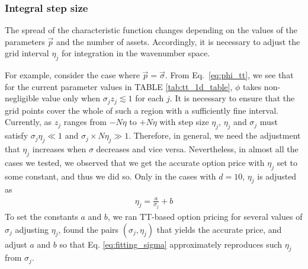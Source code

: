 \subsubsection*{Integral step size}
The spread of the characteristic function changes depending on the values of the parameters $\vec{p}$ and the number of assets. 
Accordingly, it is necessary to adjust the grid interval $\eta_j$ for integration in the wavenumber space.

For example, consider the case where $\vec{p}=\vec{\sigma}$. 
From Eq.~\eqref{eq:phi_tt}, we see that for the current parameter values in TABLE \ref{tab:tt_1d_table}, $\phi$ takes non-negligible value only when $\sigma_j z_j \lesssim 1$ for each $j$.
It is necessary to ensure that the grid points cover the whole of such a region with a sufficiently fine interval. Currently, as $z_j$ ranges from $-N\eta$ to $+N\eta$ with step size $\eta_j$, $\eta_j$ and $\sigma_j$ must satisfy $\sigma_j \eta_j \ll 1$ and $\sigma_j \times N \eta_j \gg 1$.
Therefore, in general, we need the adjustment that $\eta_j$ increases when $\sigma$ decreases and vice versa.
Nevertheless, in almost all the cases we tested, we observed that we get the accurate option price with $\eta_j$ set to some constant, and thus we did so.
Only in the cases with $d=10$, $\eta_j$ is adjusted as
\begin{align}
    \eta_j = \frac{a}{\sigma_j} + b
    \label{eq:fitting_sigma}
\end{align}
To set the constants $a$ and $b$, we ran TT-based option pricing for several values of $\sigma_j$ adjusting $\eta_j$, found the pairs $(\sigma_j,\eta_j)$ that yields the accurate price, and adjust $a$ and $b$ so that Eq. \eqref{eq:fitting_sigma} approximately reproduces such $\eta_j$ from $\sigma_j$.




\begin{comment}
For example, in our numerical calculations, for $d=5$ to $9$, it was possible to accurately compute the option prices with a constant value of $\eta$ regardless of the asset. 
When $d=10$, it became necessary to adjust $\eta$ for each asset individually. 
Figure~\ref{fig:sigma_tts} represents the tensor trains when \(\eta\) is not adjusted for each asset and when it is adjusted for each asset.
In Fig.~\ref{fig:sigma_tts}(a) for $d=5$, the equation $\eqref{eq:vmin_tt}$ does not depend on $\vec{\sigma}$, while in Fig. ~\ref{fig:sigma_tts}(b) for $d=10$, the equation $\eqref{eq:vmin_tt}$ depends on the parameter $\vec{\sigma}$, which should have no dependence. 
This is because from eq.~\eqref{eq:V_continuous}, the equation $\eqref{eq:vmin_tt}$ becomes a function of $\eta$, and in this case, $\eta$ is varied for each asset, making $\eta$ a function of $\sigma$.
\end{comment}

